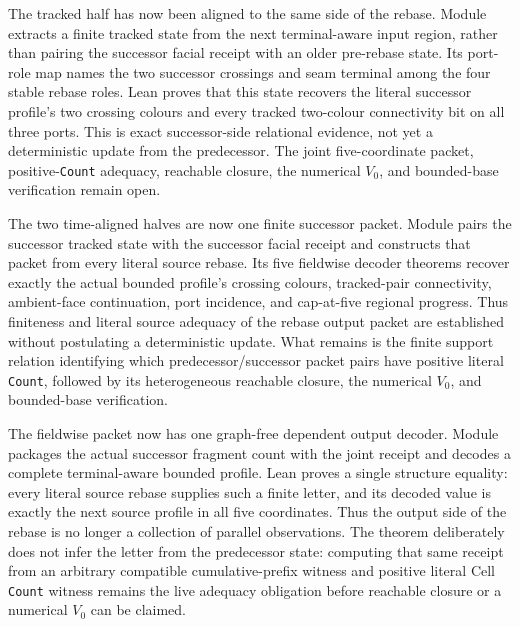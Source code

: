 \documentclass[11pt]{article}
\theoremstyle{definition}
\begin{document}
The tracked half has now been aligned to the same side of the rebase.  Module
extracts a finite tracked state from the next terminal-aware input region,
rather than pairing the successor facial receipt with an older pre-rebase
state.  Its port-role map names the two successor crossings and seam terminal
among the four stable rebase roles.  Lean proves that this state recovers the
literal successor profile's two crossing colours and every tracked two-colour
connectivity bit on all three ports.  This is exact successor-side relational
evidence, not yet a deterministic update from the predecessor.  The joint
five-coordinate packet, positive-\texttt{Count} adequacy, reachable closure,
the numerical $V_0$, and bounded-base verification remain open.

The two time-aligned halves are now one finite successor packet.  Module
pairs the successor tracked state with the successor facial receipt and
constructs that packet from every literal source rebase.  Its five fieldwise
decoder theorems recover exactly the actual bounded profile's crossing
colours, tracked-pair connectivity, ambient-face continuation, port incidence,
and cap-at-five regional progress.  Thus finiteness and literal source
adequacy of the rebase output packet are established without postulating a
deterministic update.  What remains is the finite support relation identifying
which predecessor/successor packet pairs have positive literal
\texttt{Count}, followed by its heterogeneous reachable closure, the numerical
$V_0$, and bounded-base verification.

The fieldwise packet now has one graph-free dependent output decoder.  Module
packages the actual successor fragment count with the joint receipt and
decodes a complete terminal-aware bounded profile.  Lean proves a single
structure equality: every literal source rebase supplies such a finite letter,
and its decoded value is exactly the next source profile in all five
coordinates.  Thus the output side of the rebase is no longer a collection of
parallel observations.  The theorem deliberately does not infer the letter
from the predecessor state: computing that same receipt from an arbitrary
compatible cumulative-prefix witness and positive literal Cell
\texttt{Count} witness remains the live adequacy obligation before reachable
closure or a numerical $V_0$ can be claimed.
\end{document}
